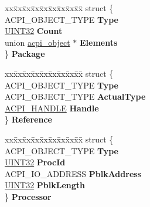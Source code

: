 \begin{DoxyCompactItemize}
\begin{tabbing}
\end{tabbing}\item 
\mbox{\label{unionacpi__object_aaefffbf22875e82644128ef4c6ced688}} 
\begin{tabbing}
xx\=xx\=xx\=xx\=xx\=xx\=xx\=xx\=xx\=\kill
struct \{\\
\>ACPI\_OBJECT\_TYPE {\bfseries Type}\\
\>\hyperlink{_processor_bind_8h_ae1e6edbbc26d6fbc71a90190d0266018}{UINT32} {\bfseries Count}\\
\>union \hyperlink{unionacpi__object}{acpi\_object} $\ast$ {\bfseries Elements}\\
\} {\bfseries Package}\\

\end{tabbing}\item 
\mbox{\label{unionacpi__object_a0bb4df2840342f36cbeb529fb6ce5931}} 
\begin{tabbing}
xx\=xx\=xx\=xx\=xx\=xx\=xx\=xx\=xx\=\kill
struct \{\\
\>ACPI\_OBJECT\_TYPE {\bfseries Type}\\
\>ACPI\_OBJECT\_TYPE {\bfseries ActualType}\\
\>\hyperlink{interfacevoid}{ACPI\_HANDLE} {\bfseries Handle}\\
\} {\bfseries Reference}\\

\end{tabbing}\item 
\mbox{\label{unionacpi__object_a6d3557527f1e50421a3270a2120b29c5}} 
\begin{tabbing}
xx\=xx\=xx\=xx\=xx\=xx\=xx\=xx\=xx\=\kill
struct \{\\
\>ACPI\_OBJECT\_TYPE {\bfseries Type}\\
\>\hyperlink{_processor_bind_8h_ae1e6edbbc26d6fbc71a90190d0266018}{UINT32} {\bfseries ProcId}\\
\>ACPI\_IO\_ADDRESS {\bfseries PblkAddress}\\
\>\hyperlink{_processor_bind_8h_ae1e6edbbc26d6fbc71a90190d0266018}{UINT32} {\bfseries PblkLength}\\
\} {\bfseries Processor}\\


\end{tabbing}
\end{DoxyCompactItemize}
